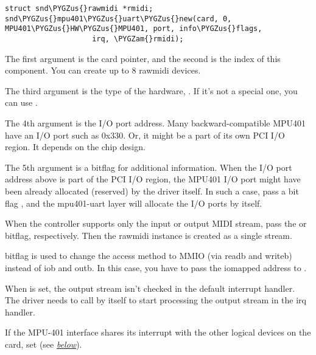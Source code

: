 \documentclass[a4paper,8pt,english]{sphinxmanual}
\def\PYGZus{\char`\_}
\def\PYGZam{\char`\&}
\begin{document}
\begin{Verbatim}[commandchars=\\\{\}]
struct snd\PYGZus{}rawmidi *rmidi;
snd\PYGZus{}mpu401\PYGZus{}uart\PYGZus{}new(card, 0, MPU401\PYGZus{}HW\PYGZus{}MPU401, port, info\PYGZus{}flags,
                    irq, \PYGZam{}rmidi);
\end{Verbatim}

The first argument is the card pointer, and the second is the index of
this component. You can create up to 8 rawmidi devices.

The third argument is the type of the hardware, . If
it's not a special one, you can use .

The 4th argument is the I/O port address. Many backward-compatible
MPU401 have an I/O port such as 0x330. Or, it might be a part of its own
PCI I/O region. It depends on the chip design.

The 5th argument is a bitflag for additional information. When the I/O
port address above is part of the PCI I/O region, the MPU401 I/O port
might have been already allocated (reserved) by the driver itself. In
such a case, pass a bit flag , and the
mpu401-uart layer will allocate the I/O ports by itself.

When the controller supports only the input or output MIDI stream, pass
the  or  bitflag,
respectively. Then the rawmidi instance is created as a single stream.

 bitflag is used to change the access method to MMIO
(via readb and writeb) instead of iob and outb. In this case, you have
to pass the iomapped address to {\hyperref[sound/kernel\string-api/alsa\string-driver\string-api:c.snd_mpu401_uart_new]{\emph{}}}.

When  is set, the output stream isn't checked in
the default interrupt handler. The driver needs to call
{\hyperref[sound/kernel\string-api/alsa\string-driver\string-api:c.snd_mpu401_uart_interrupt_tx]{\emph{}}} by itself to start
processing the output stream in the irq handler.

If the MPU-401 interface shares its interrupt with the other logical
devices on the card, set  (see
{\hyperref[sound/kernel\string-api/writing\string-an\string-alsa\string-driver:MIDI\string-Interrupt\string-Handler]{\emph{below}}}).
\end{document}
